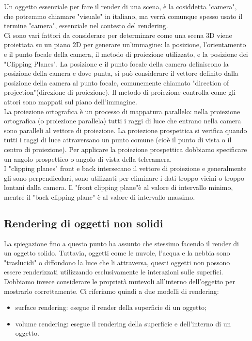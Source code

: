 Un oggetto essenziale per fare il render di una scena, è la cosiddetta "camera", che potremmo chiamare "visuale" in italiano, ma verrà comunque spesso usato il termine "camera", essenziale nel contesto del rendering.\\
Ci sono vari fattori da considerare per determinare come una scena 3D viene proiettata su un piano 2D per generare un'immagine: la posizione, l'orientamento e il punto focale della camera, il metodo di proiezione utilizzato, e la posizione dei "Clipping Planes". La posizione e il punto focale della camera definiscono la posizione della camera e dove punta, si può considerare il vettore definito dalla posizione della camera al punto focale, comunemente chiamato "direction of projection"(direzione di proiezione). Il metodo di proiezione controlla come gli attori sono mappati sul piano dell'immagine.
\\
La proiezione ortografica è un processo di mappatura parallelo: nella proiezione ortografica (o proiezione parallela) tutti i raggi di luce che entrano nella camera sono paralleli al vettore di proiezione. La proiezione prospettica si verifica quando tutti i raggi di luce attraversano un punto comune (cioè il punto di vista o il centro di proiezione). Per applicare la proiezione prospettica dobbiamo specificare un angolo prospettico o angolo di vista della telecamera.
\\
I "clipping planes" front e back intersecano il vettore di proiezione e generalmente gli sono perpendicolari, sono utilizzati per eliminare i dati troppo vicini o troppo lontani dalla camera. Il "front clipping plane"è al valore di intervallo minimo, mentre il "back clipping plane" è al valore di intervallo massimo.

\subsection{Rendering di oggetti non solidi}
La spiegazione fino a questo punto ha assunto che stessimo facendo il render di un oggetto solido. Tuttavia, oggetti come le nuvole, l'acqua e la nebbia sono "traslucidi" o diffondono la luce che li attraversa, questi oggetti non possono essere renderizzati utilizzando esclusivamente le interazioni sulle superfici. Dobbiamo invece considerare le proprietà mutevoli all'interno dell'oggetto per mostrarlo correttamente. Ci riferiamo quindi a due modelli di rendering:
\begin{itemize}
\item surface rendering: esegue il render della superficie di un oggetto;
\item volume rendering: esegue il rendering della superficie e dell'interno di un oggetto.
\end{itemize}

